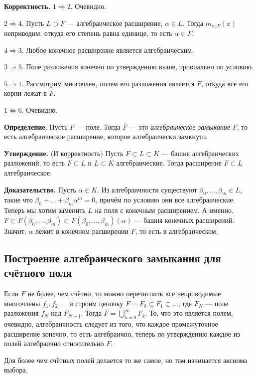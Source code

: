 \textbf{Корректность.}
$1 \Rightarrow 2$. Очевидно.

$2 \Rightarrow 4$. Пусть $L \supset F$ --- алгебраическое расширение, $\alpha \in L$.
Тогда $m_{\alpha, F}(x)$ неприводим, откуда его степень равна единице, то есть $\alpha \in F$.

$4 \Rightarrow 3$. Любое конечное расширение является алгебраическим.

$3 \Rightarrow 5$. Поле разложения конечно по утверждению выше, тривиально по условию.

$5 \Rightarrow 1$. Рассмотрим многочлен, полем его разложения является $F$, откуда все его корни лежат в $F$.

$1 \iff 6$. Очевидно.

\QED

\textbf{Определение.} Пусть $F$ --- поле.
Тогда $\overline F$ --- это \textit{алгебраическое замыкание} $F$, то есть алгебраическое расширение, которое алгебраически замкнуто.

\textbf{Утверждение.} (И корректность) Пусть $F \subset L \subset K$ --- башня алгебраических разложений, то есть $F \subset L$ и $L \subset K$ алгебраические.
Тогда расширение $F \subset L$ алгебраическое.

\textbf{Доказательство.} Пусть $\alpha \in K$.
\sloppy Из алгебраичности существуют $\beta_0, \dots, \beta_m \in L$, такие что $\beta_0 + \dots + \beta_m \alpha^m = 0$, причём по условию они все алгебраические.
Теперь мы хотим заменить $L$ на поля с конечным расширением.
А именно, $F \subset F(\beta_0, \dots, \beta_m) \subset F(\beta_0, \dots, \beta_m)(\alpha)$ --- башня конечных расширений.
Значит, $\alpha$ лежит в конечном расширении $F$, то есть в алгебраическом.

\QED

\subsection{Построение алгебраического замыкания для счётного поля}
Если $F$ не более, чем счётно, то можно перечислить все неприводимые многочлены $f_1, f_2, \dots$ и строим цепочку $F = F_0 \subset F_1 \subset \dots$, где $F_N$ --- поле разложения $f_N$ над $F_{N-1}$.
Тогда $\overline F = \bigcup_{k=0}^{\infty} F_k$.
То, что это является полем, очевидно, алгебраичность следует из того, что каждое промежуточное расширение конечно, то есть алгебраично, теперь по утверждению каждое из полей алгебраично относительно $F$.

Для более чем счётных полей делается то же самое, но там начинается аксиома выбора.

